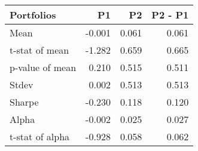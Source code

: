 \begin{tabular}{lrrr}
\toprule
Portfolios & P1 & P2 & P2 - P1 \\
\midrule
Mean & -0.001 & 0.061 & 0.061 \\
t-stat of mean & -1.282 & 0.659 & 0.665 \\
p-value of mean & 0.210 & 0.515 & 0.511 \\
Stdev & 0.002 & 0.513 & 0.513 \\
Sharpe & -0.230 & 0.118 & 0.120 \\
Alpha & -0.002 & 0.025 & 0.027 \\
t-stat of alpha & -0.928 & 0.058 & 0.062 \\
\bottomrule
\end{tabular}
